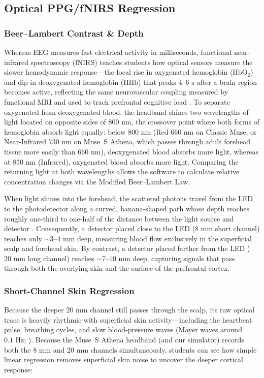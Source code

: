 \documentclass[11pt]{article}
\begin{document}
\subsection{Optical PPG/fNIRS Regression}

\subsubsection{Beer--Lambert Contrast \& Depth}
Whereas EEG measures fast electrical activity in milliseconds, functional near-infrared spectroscopy (fNIRS) teaches students how optical sensors measure the slower hemodynamic response---the local rise in oxygenated hemoglobin ($\text{HbO}_2$) and dip in deoxygenated hemoglobin ($\text{HHb}$) that peaks $4\text{--}6\text{ s}$ after a brain region becomes active, reflecting the same neurovascular coupling measured by functional MRI and used to track prefrontal cognitive load \citep{delpy1988estimation,scholkmann2014review,russo2025fnirs}. To separate oxygenated from deoxygenated blood, the headband shines two wavelengths of light located on opposite sides of $800\text{ nm}$, the crossover point where both forms of hemoglobin absorb light equally: below $800\text{ nm}$ (Red $660\text{ nm}$ on Classic Muse, or Near-Infrared $730\text{ nm}$ on Muse~S Athena, which passes through adult forehead tissue more easily than $660\text{ nm}$), deoxygenated blood absorbs more light, whereas at $850\text{ nm}$ (Infrared), oxygenated blood absorbs more light. Comparing the returning light at both wavelengths allows the software to calculate relative concentration changes via the Modified Beer--Lambert Law.

When light shines into the forehead, the scattered photons travel from the LED to the photodetector along a curved, banana-shaped path whose depth reaches roughly one-third to one-half of the distance between the light source and detector \citep{delpy1988estimation,saager2005direct,wyser2020short}. Consequently, a detector placed close to the LED ($8\text{ mm}$ short channel) reaches only $\sim 3\text{--}4\text{ mm}$ deep, measuring blood flow exclusively in the superficial scalp and forehead skin. By contrast, a detector placed farther from the LED ($20\text{ mm}$ long channel) reaches $\sim 7\text{--}10\text{ mm}$ deep, capturing signals that pass through both the overlying skin and the surface of the prefrontal cortex.

\subsubsection{Short-Channel Skin Regression}
Because the deeper $20\text{ mm}$ channel still passes through the scalp, its raw optical trace is heavily rhythmic with superficial skin activity---including the heartbeat pulse, breathing cycles, and slow blood-pressure waves (Mayer waves around $0.1\text{ Hz}$; \citealp{scholkmann2014review,wyser2020short}). Because the Muse~S Athena headband (and our simulator) records both the $8\text{ mm}$ and $20\text{ mm}$ channels simultaneously, students can see how simple linear regression removes superficial skin noise to uncover the deeper cortical response:
\end{document}
